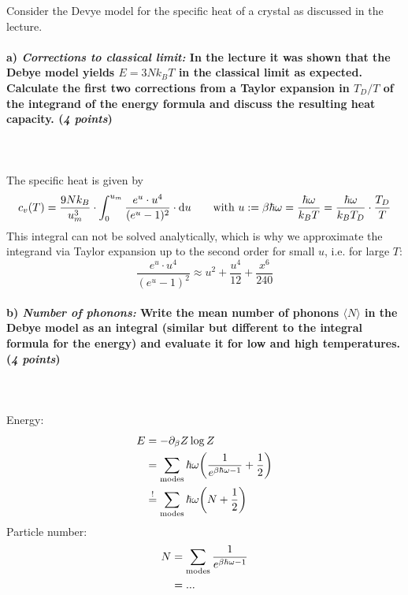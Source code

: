 Consider the Devye model for the specific heat of a crystal as discussed 
in the lecture.

\paragraph{a) \textit{Corrections to classical limit:} In the lecture it was 
    shown that the Debye model yields $E=3Nk_BT$ in the classical limit as 
    expected. Calculate the first two corrections from a Taylor expansion in 
    $T_D/T$ of the integrand of the energy formula and discuss the 
    resulting heat capacity. (\textit{4 points})
} \ \\
    \\
    The specific heat is given by
    \begin{equation}
        c_v(T)
        =\frac{9Nk_B}{u^3_m}\cdot\int_0^{u_m}
        \frac{e^u\cdot u^4}{(e^u-1)^2}\cdot\mathrm{d} u
        \ \ \ \ \ \ \textnormal{with }
        u:=\beta\hbar\omega=\frac{\hbar\omega}{k_BT}
        =\frac{\hbar\omega}{k_BT_D}\cdot\frac{T_D}{T}
    \end{equation}
    This integral can not be solved analytically, which is why we approximate
    the integrand via Taylor expansion up to the second order for small $u$,
    i.e. for large $T$:
    \begin{equation}
        \frac{e^u\cdot u^4}{(e^u-1)^2}
        \approx u^2+\frac{u^4}{12}+\frac{x^6}{240}
    \end{equation}

\paragraph{b) \textit{Number of phonons:} Write the mean number of phonons 
    $\langle N\rangle$ in the Debye model as an integral (similar but 
    different to the integral formula for the energy) and evaluate it for low 
    and high temperatures. (\textit{4 points})
} \ \\
    \\
    Energy:
    \begin{align}
        E
        &=-\partial_\beta Z\log Z \\
        &=\sum_\textnormal{modes}\hbar\omega
        \bigg(\frac{1}{e^{\beta\hbar\omega-1}}+\frac{1}{2}\bigg) \\
        &\overset{!}{=}\sum_\textnormal{modes}\hbar\omega
        \bigg(N+\frac{1}{2}\bigg)
    \end{align}
    Particle number:
    \begin{align}
        N
        &=\sum_\textnormal{modes}
        \frac{1}{e^{\beta\hbar\omega-1}} \\
        &=...
    \end{align}  %
